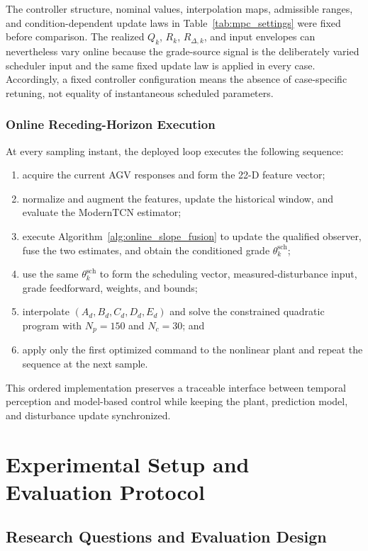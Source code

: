 \documentclass{ieeeaccess}
\begin{document}
The controller structure, nominal values, interpolation maps, admissible ranges, and condition-dependent update laws in Table~\ref{tab:mpc_settings} were fixed before comparison. The realized $Q_k$, $R_k$, $R_{\Delta,k}$, and input envelopes can nevertheless vary online because the grade-source signal is the deliberately varied scheduler input and the same fixed update law is applied in every case. Accordingly, a fixed controller configuration means the absence of case-specific retuning, not equality of instantaneous scheduled parameters.

\subsubsection{Online Receding-Horizon Execution}

At every sampling instant, the deployed loop executes the following sequence:
\begin{enumerate}
\item acquire the current AGV responses and form the 22-D feature vector;
\item normalize and augment the features, update the historical window, and evaluate the ModernTCN estimator;
\item execute Algorithm~\ref{alg:online_slope_fusion} to update the qualified observer, fuse the two estimates, and obtain the conditioned grade $\theta_k^{\mathrm{sch}}$;
\item use the same $\theta^{\mathrm{sch}}_k$ to form the scheduling vector, measured-disturbance input, grade feedforward, weights, and bounds;
\item interpolate $(A_d,B_d,C_d,D_d,E_d)$ and solve the constrained quadratic program with $N_p=150$ and $N_c=30$; and
\item apply only the first optimized command to the nonlinear plant and repeat the sequence at the next sample.
\end{enumerate}
This ordered implementation preserves a traceable interface between temporal perception and model-based control while keeping the plant, prediction model, and disturbance update synchronized.

\section{Experimental Setup and Evaluation Protocol}
\label{sec:experiment_design}

\subsection{Research Questions and Evaluation Design}
\end{document}
